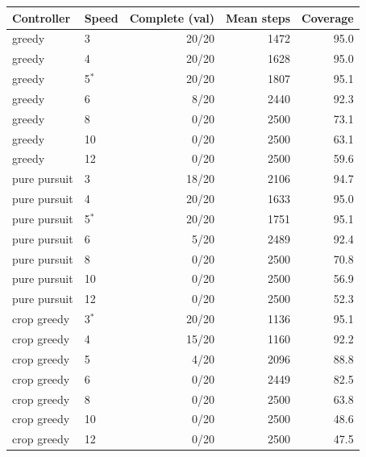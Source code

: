 \begin{tabular}{llrrr}
\toprule
Controller & Speed & Complete (val) & Mean steps & Coverage \\
\midrule
greedy & 3 & 20/20 & 1472 & 95.0 \\
greedy & 4 & 20/20 & 1628 & 95.0 \\
greedy & 5$^*$ & 20/20 & 1807 & 95.1 \\
greedy & 6 & 8/20 & 2440 & 92.3 \\
greedy & 8 & 0/20 & 2500 & 73.1 \\
greedy & 10 & 0/20 & 2500 & 63.1 \\
greedy & 12 & 0/20 & 2500 & 59.6 \\
pure pursuit & 3 & 18/20 & 2106 & 94.7 \\
pure pursuit & 4 & 20/20 & 1633 & 95.0 \\
pure pursuit & 5$^*$ & 20/20 & 1751 & 95.1 \\
pure pursuit & 6 & 5/20 & 2489 & 92.4 \\
pure pursuit & 8 & 0/20 & 2500 & 70.8 \\
pure pursuit & 10 & 0/20 & 2500 & 56.9 \\
pure pursuit & 12 & 0/20 & 2500 & 52.3 \\
crop greedy & 3$^*$ & 20/20 & 1136 & 95.1 \\
crop greedy & 4 & 15/20 & 1160 & 92.2 \\
crop greedy & 5 & 4/20 & 2096 & 88.8 \\
crop greedy & 6 & 0/20 & 2449 & 82.5 \\
crop greedy & 8 & 0/20 & 2500 & 63.8 \\
crop greedy & 10 & 0/20 & 2500 & 48.6 \\
crop greedy & 12 & 0/20 & 2500 & 47.5 \\
\bottomrule
\end{tabular}
